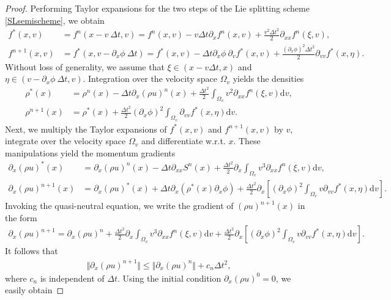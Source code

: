 \documentclass[letterpaper,10pt]{article}
\numberwithin{equation}{section}
\numberwithin{figure}{section}
\numberwithin{table}{section}
\begin{document}
\begin{proof}
Performing Taylor expansions for the two steps 
of the Lie splitting scheme \eqref{SLsemischeme}, we obtain
\begin{align*}
        f^*(x,v)&=f^n(x-v~\Delta t,v)=f^n(x,v)-v\Delta t\partial_xf^n(x,v)+\frac{v^2\Delta t^2}{2}\partial_{xx}f^n(\xi,v),\\
        f^{n+1}(x,v)&=f^*(x,v-\partial_x\phi~\Delta t)=f^*(x,v)-\Delta t\partial_x\phi~\partial_vf^*(x,v)+\frac{(\partial_x\phi)^2\Delta t^2}{2}\partial_{vv}f^*(x,\eta).
\end{align*}
Without loss of generality, we assume that $\xi\in(x-v\Delta t,x)$ and $\eta\in(v-\partial_x\phi~\Delta t,v)$. Integration over the velocity space $\Omega_v$ yields the densities
\begin{align*}
    \rho^*(x)&=\rho^n(x)-\Delta t\partial_x(\rho u)^n(x)+\frac{\Delta t^2}{2}\int_{\Omega_v}v^2\partial_{xx}f^n(\xi,v)\mathrm dv,\\
    \rho^{n+1}(x)&=\rho^*(x)+\frac{\Delta t^2}{2}(\partial_x\phi)^2\int_{\Omega_v}\partial_{vv}f^*(x,\eta)\mathrm dv.
\end{align*}
Next, we multiply the Taylor expansions of
$f^*(x,v)$ and $f^{n+1}(x,v)$ by $v$, integrate
over the velocity space $\Omega_v$ and differentiate w.r.t. $x$. These
manipulations yield the momentum gradients
\begin{align*}
    \partial_x(\rho u)^*(x)&=\partial_x(\rho u)^n(x)-\Delta t\partial_{xx}S^n(x)+\frac{\Delta t^2}{2}\partial_x\int_{\Omega_v}v^3\partial_{xx}f^n(\xi,v)\mathrm dv,\\
    \partial_x(\rho u)^{n+1}(x)&=\partial_x(\rho u)^*(x)+\Delta t\partial_x\left(\rho^*(x)\partial_x\phi\right)+\frac{\Delta t^2}{2}\partial_x\left[(\partial_x\phi)^2\int_{\Omega_v}v\partial_{vv}f^*(x,\eta)\mathrm dv\right].
\end{align*}
Invoking the quasi-neutral equation, we write the gradient of $(\rho u)^{n+1}(x)$
in the form
\begin{align*}
     \partial_x(\rho u)^{n+1}=\partial_x(\rho u)^n+\frac{\Delta t^2}{2}\partial_x\int_{\Omega_v}v^3\partial_{xx}f^n(\xi,v)\mathrm dv+\frac{\Delta t^2}{2}\partial_x\left[(\partial_x\phi)^2\int_{\Omega_v}v\partial_{vv}f^*(x,\eta)\mathrm dv\right].
\end{align*}
It follows that
\begin{align*}
    \Vert \partial_x(\rho u)^{n+1}\Vert\leq\Vert\partial_x(\rho u)^n\Vert+c_n\Delta t^2,
\end{align*}
where $c_n$ is independent of $\Delta t$. Using the initial condition $\partial_x(\rho u)^0=0$, we easily obtain

\end{proof}
\end{document}
